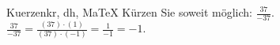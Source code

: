 \begin{MAufgabe}{Kuerzen}{kr, dh, MaTeX}
K\"urzen Sie soweit m\"oglich: $\frac{37}{-37}$.\\ 
\ifLsg\MLoesung
\quad $\frac{37}{-37}=\frac{(37)\cdot(1)}{(37)\cdot(-1)}=\frac{1}{-1}=-1$.\else\relax\fi
 \end{MAufgabe}